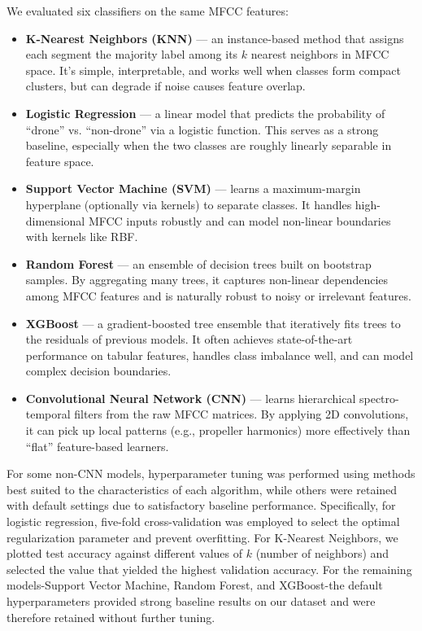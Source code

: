 \documentclass[12pt]{article}
\begin{document}
{\fontsize{9}{11}\selectfont
We evaluated six classifiers on the same MFCC features:
\begin{itemize}
  \item \textbf{K-Nearest Neighbors (KNN)} — an instance-based method that assigns each segment the majority label among its $k$ nearest neighbors in MFCC space. It’s simple, interpretable, and works well when classes form compact clusters, but can degrade if noise causes feature overlap.
  \item \textbf{Logistic Regression} — a linear model that predicts the probability of “drone” vs. “non-drone” via a logistic function. This serves as a strong baseline, especially when the two classes are roughly linearly separable in feature space.
  \item \textbf{Support Vector Machine (SVM)} — learns a maximum-margin hyperplane (optionally via kernels) to separate classes. It handles high-dimensional MFCC inputs robustly and can model non-linear boundaries with kernels like RBF.
  \item \textbf{Random Forest} — an ensemble of decision trees built on bootstrap samples. By aggregating many trees, it captures non-linear dependencies among MFCC features and is naturally robust to noisy or irrelevant features.
  \item \textbf{XGBoost} — a gradient-boosted tree ensemble that iteratively fits trees to the residuals of previous models. It often achieves state-of-the-art performance on tabular features, handles class imbalance well, and can model complex decision boundaries.
  \item \textbf{Convolutional Neural Network (CNN)} — learns hierarchical spectro-temporal filters from the raw MFCC matrices. By applying 2D convolutions, it can pick up local patterns (e.g., propeller harmonics) more effectively than “flat” feature-based learners.
\end{itemize}

For some non-CNN models, hyperparameter tuning was performed using methods best suited to the characteristics of each algorithm, while others were retained with default settings due to satisfactory baseline performance. Specifically, for logistic regression, five-fold cross-validation was employed to select the optimal regularization parameter and prevent overfitting. For K-Nearest Neighbors, we plotted test accuracy against different values of $k$ (number of neighbors) and selected the value that yielded the highest validation accuracy. For the remaining models-Support Vector Machine, Random Forest, and XGBoost-the default hyperparameters provided strong baseline results on our dataset and were therefore retained without further tuning.

}
\end{document}
